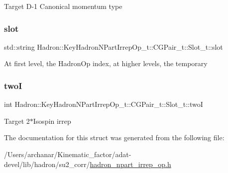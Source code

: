 Target D-\/1 Canonical momentum type \mbox{\label{structHadron_1_1KeyHadronNPartIrrepOp__t_1_1CGPair__t_1_1Slot__t_a48786cd4ae0529fc0b55e99893257007}} 
\subsubsection{\texorpdfstring{slot}{slot}}
{\footnotesize\ttfamily std\+::string Hadron\+::\+Key\+Hadron\+N\+Part\+Irrep\+Op\+\_\+t\+::\+C\+G\+Pair\+\_\+t\+::\+Slot\+\_\+t\+::slot}

At first level, the Hadron\+Op index, at higher levels, the temporary \mbox{\label{structHadron_1_1KeyHadronNPartIrrepOp__t_1_1CGPair__t_1_1Slot__t_a8586d34f626ec15fbebf2b18c82a9184}} 
\subsubsection{\texorpdfstring{twoI}{twoI}}
{\footnotesize\ttfamily int Hadron\+::\+Key\+Hadron\+N\+Part\+Irrep\+Op\+\_\+t\+::\+C\+G\+Pair\+\_\+t\+::\+Slot\+\_\+t\+::twoI}

Target 2$\ast$\+Isospin irrep 

The documentation for this struct was generated from the following file\+:\begin{DoxyCompactItemize}
\item 
/\+Users/archanar/\+Kinematic\+\_\+factor/adat-\/devel/lib/hadron/su2\+\_\+corr/\mbox{\hyperlink{adat-devel_2lib_2hadron_2su2__corr_2hadron__npart__irrep__op_8h}{hadron\+\_\+npart\+\_\+irrep\+\_\+op.\+h}}\end{DoxyCompactItemize}
